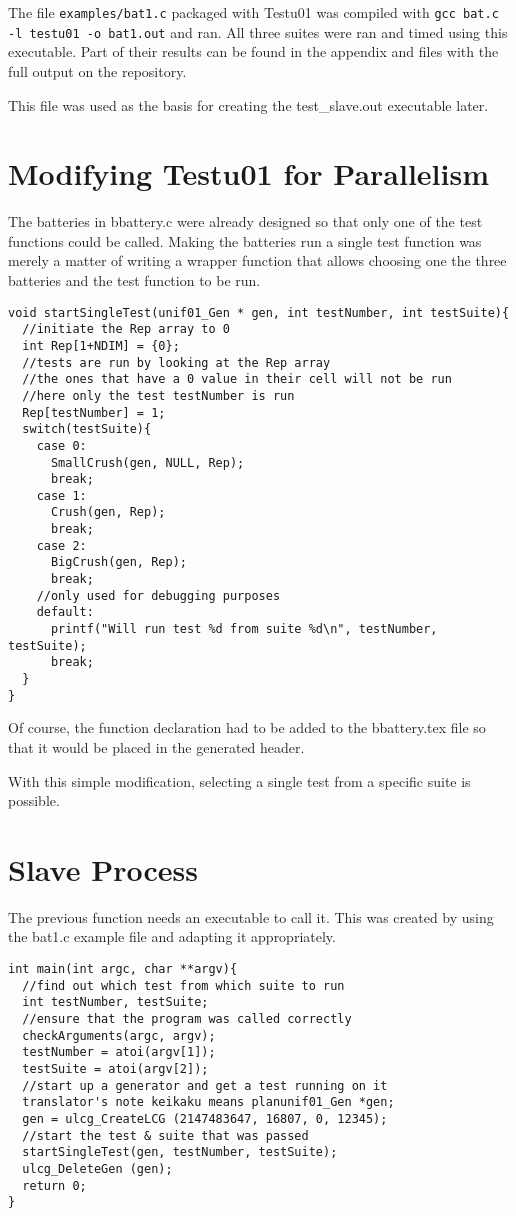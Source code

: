 The file \texttt{examples/bat1.c} packaged with Testu01 was compiled with \texttt{gcc bat.c -l testu01 -o bat1.out} and ran. All three suites were ran and timed using this executable. Part of their results can be found in the appendix and files with the full output on the repository\cite{githubrepo}.

This file was used as the basis for creating the test\_slave.out executable later.

\section{Modifying Testu01 for Parallelism}
The batteries in bbattery.c were already designed so that only one of the test functions could be called. Making the batteries run a single test function was merely a matter of writing a wrapper function that allows choosing one the three batteries and the test function to be run.

\begin{verbatim}
void startSingleTest(unif01_Gen * gen, int testNumber, int testSuite){
  //initiate the Rep array to 0
  int Rep[1+NDIM] = {0};
  //tests are run by looking at the Rep array
  //the ones that have a 0 value in their cell will not be run
  //here only the test testNumber is run
  Rep[testNumber] = 1;
  switch(testSuite){
    case 0:
      SmallCrush(gen, NULL, Rep);
      break;
    case 1:
      Crush(gen, Rep);
      break;
    case 2:
      BigCrush(gen, Rep);
      break;
    //only used for debugging purposes
    default:
      printf("Will run test %d from suite %d\n", testNumber, testSuite);
      break;
  }
} 
\end{verbatim}

Of course, the function declaration had to be added to the bbattery.tex file so that it would be placed in the generated header.

With this simple modification, selecting a single test from a specific suite is possible.

\section{Slave Process}
The previous function needs an executable to call it. This was created by using the bat1.c example file and adapting it appropriately.


\begin{verbatim}
int main(int argc, char **argv){
  //find out which test from which suite to run
  int testNumber, testSuite;
  //ensure that the program was called correctly
  checkArguments(argc, argv);
  testNumber = atoi(argv[1]);
  testSuite = atoi(argv[2]);
  //start up a generator and get a test running on it 
  translator's note keikaku means planunif01_Gen *gen;
  gen = ulcg_CreateLCG (2147483647, 16807, 0, 12345);
  //start the test & suite that was passed 
  startSingleTest(gen, testNumber, testSuite);
  ulcg_DeleteGen (gen);
  return 0;
}     
\end{verbatim}

